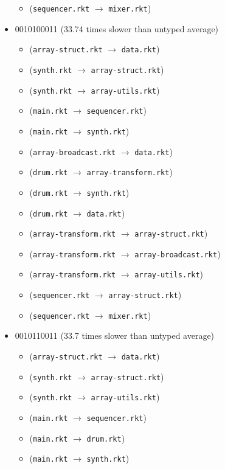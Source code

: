 \documentclass{article}
\newcommand{\mono}[1]{\texttt{#1}}
\begin{document}
\begin{itemize}
\begin{itemize}
  \item (\mono{sequencer.rkt} $\rightarrow$ \mono{mixer.rkt})
  \end{itemize}
\item 0010100011 (33.74 times slower than untyped average)
  \begin{itemize}
  \item (\mono{array-struct.rkt} $\rightarrow$ \mono{data.rkt})
  \item (\mono{synth.rkt} $\rightarrow$ \mono{array-struct.rkt})
  \item (\mono{synth.rkt} $\rightarrow$ \mono{array-utils.rkt})
  \item (\mono{main.rkt} $\rightarrow$ \mono{sequencer.rkt})
  \item (\mono{main.rkt} $\rightarrow$ \mono{synth.rkt})
  \item (\mono{array-broadcast.rkt} $\rightarrow$ \mono{data.rkt})
  \item (\mono{drum.rkt} $\rightarrow$ \mono{array-transform.rkt})
  \item (\mono{drum.rkt} $\rightarrow$ \mono{synth.rkt})
  \item (\mono{drum.rkt} $\rightarrow$ \mono{data.rkt})
  \item (\mono{array-transform.rkt} $\rightarrow$ \mono{array-struct.rkt})
  \item (\mono{array-transform.rkt} $\rightarrow$ \mono{array-broadcast.rkt})
  \item (\mono{array-transform.rkt} $\rightarrow$ \mono{array-utils.rkt})
  \item (\mono{sequencer.rkt} $\rightarrow$ \mono{array-struct.rkt})
  \item (\mono{sequencer.rkt} $\rightarrow$ \mono{mixer.rkt})
  \end{itemize}
\item 0010110011 (33.7 times slower than untyped average)
  \begin{itemize}
  \item (\mono{array-struct.rkt} $\rightarrow$ \mono{data.rkt})
  \item (\mono{synth.rkt} $\rightarrow$ \mono{array-struct.rkt})
  \item (\mono{synth.rkt} $\rightarrow$ \mono{array-utils.rkt})
  \item (\mono{main.rkt} $\rightarrow$ \mono{sequencer.rkt})
  \item (\mono{main.rkt} $\rightarrow$ \mono{drum.rkt})
  \item (\mono{main.rkt} $\rightarrow$ \mono{synth.rkt})

\end{itemize}
\end{itemize}
\end{document}
